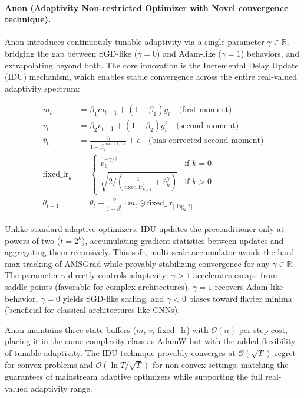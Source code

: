 \documentclass[11pt,a4paper]{article}
\begin{document}
\paragraph{Anon (Adaptivity Non-restricted Optimizer with Novel convergence technique).}
Anon \citep{anon2026anon} introduces continuously tunable adaptivity via a single parameter $\gamma \in \mathbb{R}$, bridging the gap between SGD-like ($\gamma=0$) and Adam-like ($\gamma=1$) behaviors, and extrapolating beyond both. The core innovation is the Incremental Delay Update (IDU) mechanism, which enables stable convergence across the entire real-valued adaptivity spectrum:

\begin{align}
m_t &= \beta_1 m_{t-1} + (1-\beta_1) g_t \quad\text{(first moment)}\\
v_t &= \beta_2 v_{t-1} + (1-\beta_2) g_t^2 \quad\text{(second moment)}\\
\bar{v}_t &= \frac{v_t}{1-\beta_2^{\max(t,1)}} + \epsilon \quad\text{(bias-corrected second moment)}\\
\text{fixed\_lr}_k &= \begin{cases}
\bar{v}_k^{-\gamma/2} & \text{if } k = 0 \\
\sqrt{2 / \left(\frac{1}{\text{fixed\_lr}_{k-1}^2} + \bar{v}_k^\gamma\right)} & \text{if } k > 0
\end{cases}\\
\theta_{t+1} &= \theta_t - \frac{\eta}{1-\beta_1^t} \cdot m_t \odot \text{fixed\_lr}_{\lfloor\log_2 t\rfloor}
\end{align}

Unlike standard adaptive optimizers, IDU updates the preconditioner only at powers of two ($t = 2^k$), accumulating gradient statistics between updates and aggregating them recursively. This soft, multi-scale accumulator avoids the hard max-tracking of AMSGrad while provably stabilizing convergence for any $\gamma \in \mathbb{R}$. The parameter $\gamma$ directly controls adaptivity: $\gamma > 1$ accelerates escape from saddle points (favorable for complex architectures), $\gamma = 1$ recovers Adam-like behavior, $\gamma = 0$ yields SGD-like scaling, and $\gamma < 0$ biases toward flatter minima (beneficial for classical architectures like CNNs).

Anon maintains three state buffers ($m$, $v$, fixed\_lr) with $\mathcal{O}(n)$ per-step cost, placing it in the same complexity class as AdamW but with the added flexibility of tunable adaptivity. The IDU technique provably converges at $\mathcal{O}(\sqrt{T})$ regret for convex problems and $\mathcal{O}(\ln T / \sqrt{T})$ for non-convex settings, matching the guarantees of mainstream adaptive optimizers while supporting the full real-valued adaptivity range.
\end{document}
